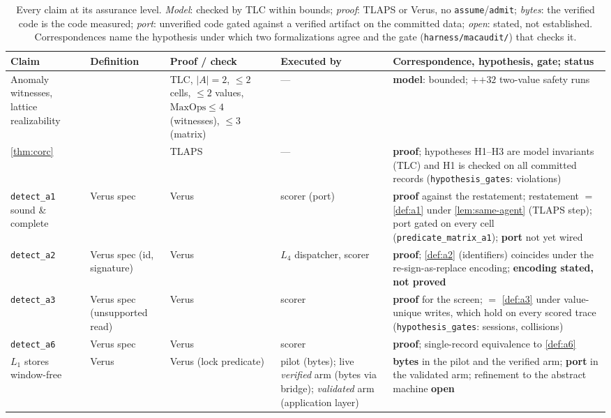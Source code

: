\begin{table}[t]
\centering
\caption{Every claim at its assurance level. \emph{Model}: checked by TLC
within bounds; \emph{proof}: TLAPS or Verus, no \texttt{assume}/\texttt{admit};
\emph{bytes}: the verified code is the code measured; \emph{port}: unverified
code gated against a verified artifact on the committed data; \emph{open}:
stated, not established. Correspondences name the hypothesis under which two
formalizations agree and the gate (\texttt{harness/macaudit/}) that checks it.}
\label{tab:assurance}
\scriptsize
\setlength{\tabcolsep}{4pt}
\begin{tabular}{@{}p{3.1cm}p{2.0cm}p{2.5cm}p{3.6cm}p{5.0cm}@{}}
\toprule
Claim & Definition & Proof / check & Executed by & Correspondence, hypothesis, gate; status \\
\midrule
Anomaly witnesses, lattice realizability & \TLA{} & TLC, $|A|{=}2$, $\le2$ cells, $\le2$ values, $\mathrm{MaxOps}\le4$ (witnesses), $\le3$ (matrix) & --- & \textbf{model}: bounded; \LatticeRuns{}$+$\LatticeMaxOpsThreeRuns{}$+32$ two-value safety runs \\
\cref{thm:corc} & \TLA{} & TLAPS \TlapsCommitOrder{} & --- & \textbf{proof}; hypotheses H1--H3 are model invariants (TLC) and H1 is checked on all \HypRecords{} committed records (\texttt{hypothesis\_gates}: \HypSameAgentOverlaps{} violations) \\
\texttt{detect\_a1} sound \& complete & Verus spec & Verus & scorer (port) & \textbf{proof} against the restatement; restatement $=$ \cref{def:a1} under \cref{lem:same-agent} (TLAPS step); port gated on every cell (\texttt{predicate\_matrix\_a1}); \textbf{port} not yet wired \\
\texttt{detect\_a2} & Verus spec (id, signature) & Verus & $L_4$ dispatcher, scorer & \textbf{proof}; \cref{def:a2} (identifiers) coincides under the re-sign-as-replace encoding; \textbf{encoding stated, not proved} \\
\texttt{detect\_a3} & Verus spec (unsupported read) & Verus & scorer & \textbf{proof} for the screen; $=$ \cref{def:a3} under value-unique writes, which hold on every scored trace (\texttt{hypothesis\_gates}: \HypLiveLtwoSessions{} sessions, \HypLiveLtwoCollisions{} collisions) \\
\texttt{detect\_a6} & Verus spec & Verus & scorer & \textbf{proof}; single-record equivalence to \cref{def:a6} \\
$L_1$ stores window-free & Verus & Verus (lock predicate) & pilot (bytes); live \emph{verified} arm (bytes via bridge); \emph{validated} arm (application layer) & \textbf{bytes} in the pilot and the verified arm; \textbf{port} in the validated arm; refinement to the abstract machine \textbf{open} \\

\end{tabular}
\end{table}
